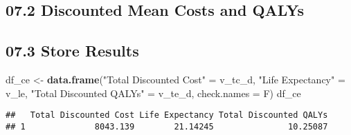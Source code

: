 \documentclass[
]{article}
\newenvironment{Shaded}{\begin{snugshade}}{\end{snugshade}}
\newcommand{\CommentTok}[1]{\textcolor[rgb]{0.56,0.35,0.01}{\textit{#1}}}
\newcommand{\DataTypeTok}[1]{\textcolor[rgb]{0.13,0.29,0.53}{#1}}
\newcommand{\KeywordTok}[1]{\textcolor[rgb]{0.13,0.29,0.53}{\textbf{#1}}}
\newcommand{\NormalTok}[1]{#1}
\newcommand{\OperatorTok}[1]{\textcolor[rgb]{0.81,0.36,0.00}{\textbf{#1}}}
\newcommand{\StringTok}[1]{\textcolor[rgb]{0.31,0.60,0.02}{#1}}
\begin{document}
\hypertarget{discounted-mean-costs-and-qalys}{%
\subsection{07.2 Discounted Mean Costs and
QALYs}\label{discounted-mean-costs-and-qalys}}

\begin{Shaded}
\end{Shaded}

\hypertarget{store-results}{%
\subsection{07.3 Store Results}\label{store-results}}

\begin{Shaded}
\begin{Highlighting}[]
\NormalTok{df_ce <-}\StringTok{ }\KeywordTok{data.frame}\NormalTok{(}\StringTok{"Total Discounted Cost"}\NormalTok{  =}\StringTok{ }\NormalTok{v_tc_d, }
                    \StringTok{"Life Expectancy"}\NormalTok{        =}\StringTok{ }\NormalTok{v_le, }
                    \StringTok{"Total Discounted QALYs"}\NormalTok{ =}\StringTok{ }\NormalTok{v_te_d, }
                     \DataTypeTok{check.names =}\NormalTok{ F)}
\NormalTok{df_ce}
\end{Highlighting}
\end{Shaded}

\begin{verbatim}
##   Total Discounted Cost Life Expectancy Total Discounted QALYs
## 1              8043.139        21.14245               10.25087
\end{verbatim}
\end{document}
